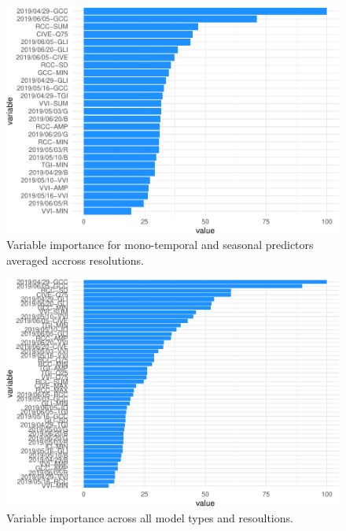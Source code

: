 \documentclass[]{article}
\begin{document}
\begin{figure}[H]

{\centering \includegraphics{report_files/figure-latex/var_imp_all-1} 

}

\caption{Variable importance for mono-temporal and seasonal predictors averaged accross resolutions.}\label{fig:var_imp_all}
\end{figure}

\begin{figure}[H]

{\centering \includegraphics{report_files/figure-latex/var_imp_together-1} 

}

\caption{Variable importance across all model types and resoultions.}\label{fig:var_imp_together}
\end{figure}
\end{document}
